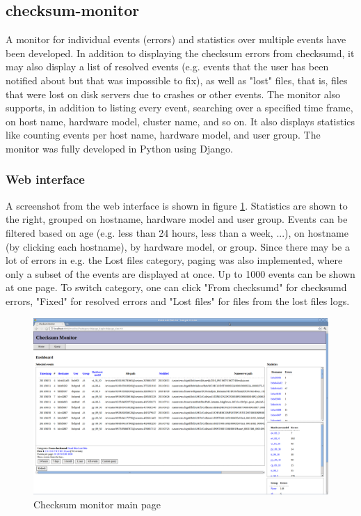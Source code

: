 \subsection{checksum-monitor}
A monitor for individual events (errors) and statistics over multiple events have been developed. In addition to displaying the checksum errors from checksumd, it may also display a list of resolved events (e.g. events that the user has been notified about but that was impossible to fix), as well as "lost" files, that is, files that were lost on disk servers due to crashes or other events.  The monitor also supports, in addition to listing every event, searching over a specified time frame, on host name, hardware model, cluster name, and so on. It also displays statistics like counting events per host name, hardware model, and user group. The monitor was fully developed in Python using Django. 

\subsubsection{Web interface}
A screenshot from the web interface is shown in figure \ref{fig:monitor-index}. Statistics are shown to the right, grouped on hostname, hardware model and user group. Events can be filtered based on age (e.g. less than 24 hours, less than a week, ...), on hostname (by clicking each hostname), by hardware model, or group. Since there may be a lot of errors in e.g. the Lost files category, paging was also implemented, where only a subset of the events are displayed at once. Up to 1000 events can be shown at one page. To switch category, one can click "From checksumd" for checksumd errors, "Fixed" for resolved errors and "Lost files" for files from the lost files logs.

\begin{figure}[ht]
\centering
\includegraphics[width=\textwidth]{gfx/checksum-monitor-main}
\caption{Checksum monitor main page}
\label{fig:monitor-index}
\end{figure}

